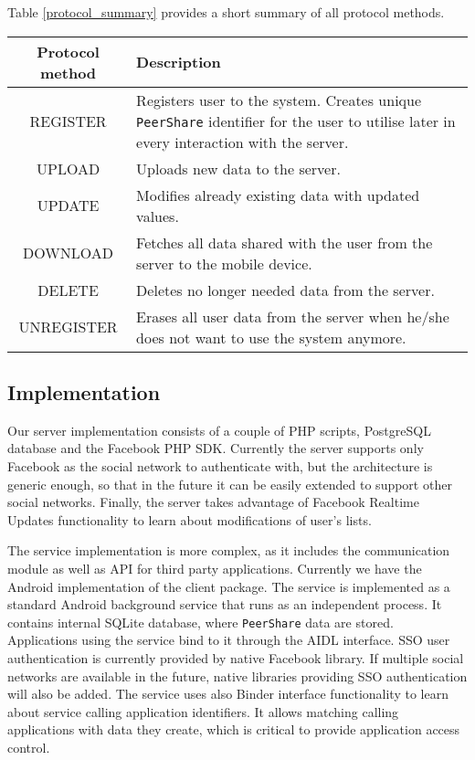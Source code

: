 \documentclass[twocolumn,a4paper,10pt]{article}
\newcommand{\peershare}{\texttt{PeerShare}\xspace}
\begin{document}
Table \ref{protocol_summary} provides a short summary of all protocol methods.

\begin{table*}[ht!]
\caption{Summary of \peershare protocol methods}
\label{protocol_summary}
\centering
\begin{tabular}{ | c | m{} | }
\hline
\textbf{Protocol method} & \textbf{Description} \\ \hline
REGISTER & Registers user to the system. Creates unique \peershare identifier for the user to utilise later in every interaction with the server.\\ \hline
UPLOAD & Uploads new data to the server. \\ \hline
UPDATE & Modifies already existing data with updated values. \\ \hline
DOWNLOAD & Fetches all data shared with the user from the server to the mobile device. \\ \hline
DELETE & Deletes no longer needed data from the server. \\ \hline
UNREGISTER & Erases all user data from the server when he/she does not want to use the system anymore. \\ \hline
\end{tabular}
\end{table*}

\subsection{Implementation}
Our server implementation consists of a couple of PHP scripts, PostgreSQL database and the Facebook PHP SDK. Currently the server supports only Facebook as the social network to authenticate with, but the architecture is generic enough, so that in the future it can be easily extended to support other social networks. Finally, the server takes advantage of Facebook Realtime Updates functionality to learn about modifications of user's lists.

The service implementation is more complex, as it includes the communication module as well as API for third party applications. Currently we have the Android implementation of the client package. The service is implemented as a standard Android background service that runs as an independent process. It contains internal SQLite database, where \peershare data are stored. Applications using the service bind to it through the AIDL interface. SSO user authentication is currently provided by native Facebook library. If multiple social networks are available in the future, native libraries providing SSO authentication will also be added. The service uses also Binder interface functionality to learn about service calling application identifiers. It allows matching calling applications with data they create, which is critical to provide application access control.
\end{document}
